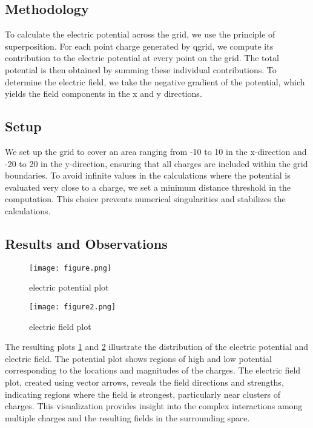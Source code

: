 \documentclass{article}
\begin{document}
\subsection{Methodology}
To calculate the electric potential across the grid, we use the principle of superposition. For each point charge generated by qgrid, we compute its contribution to the electric potential at every point on the grid. The total potential is then obtained by summing these individual contributions. To determine the electric field, we take the negative gradient of the potential, which yields the field components in the x and y directions.
\subsection{Setup}
We set up the grid to cover an area ranging from -10 to 10 in the x-direction and -20 to 20 in the y-direction, ensuring that all charges are included within the grid boundaries. To avoid infinite values in the calculations where the potential is evaluated very close to a charge, we set a minimum distance threshold in the computation. This choice prevents numerical singularities and stabilizes the calculations.
\subsection{Results and Observations} 
\begin{figure}
    \texttt{[image: figure.png]}
    \caption{electric potential plot}
    \label{potential plot}
\end{figure}
\begin{figure}
    \texttt{[image: figure2.png]}
    \caption{electric field plot}
    \label{electric field plot}
\end{figure}
The resulting plots \ref{potential plot} and \ref{electric field plot} illustrate the distribution of the electric potential and electric field. The potential plot shows regions of high and low potential corresponding to the locations and magnitudes of the charges. The electric field plot, created using vector arrows, reveals the field directions and strengths, indicating regions where the field is strongest, particularly near clusters of charges. This visualization provides insight into the complex interactions among multiple charges and the resulting fields in the surrounding space.
\end{document}

